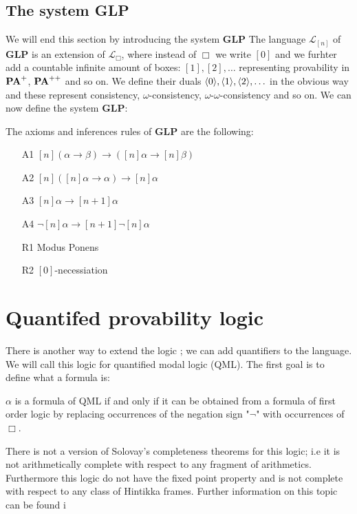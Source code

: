 \documentclass[../main.tex]{subfiles}
\begin{document}
\subsection{The system \textbf{GLP}}
We will end this section by introducing the system \textbf{GLP}
The language $\mathcal{L}_{[n]}$ of \textbf{GLP} is an extension of
$\mathcal{L}_\Box$, where instead of $\Box$ we write $[0]$ and we furhter add
a countable infinite amount of boxes:
$[1],[2],\ldots$ representing provability in $\text{\textbf{PA}}^+$, $\text{\textbf{PA}}^{++}$ and so on. We
define their duals $\langle 0\rangle,\langle 1\rangle, \langle 2\rangle,\ldots$ in the obvious way and
these represent consistency, $\omega$-consistency,
$\omega$-$\omega$-consistency and so on. We can now define the system
\textbf{GLP}:
\begin{defi}
	The axioms and inferences rules of \textbf{GLP} are the following:
	\begin{enumerate}
		\item[A1]
			$[n](\alpha\rightarrow\beta)\rightarrow([n]\alpha\rightarrow[n]\beta)$
		\item[A2] $[n]([n]\alpha\rightarrow\alpha)\rightarrow[n]\alpha$
		\item[A3] $[n]\alpha\rightarrow[n+1]\alpha$
		\item[A4] $\neg[n]\alpha\rightarrow[n+1]\neg[n]\alpha$
		\item[R1] Modus Ponens
		\item[R2] $[0]$-necessiation
	\end{enumerate}
\end{defi}

\section{Quantifed provability logic}
There is another way to extend the logic \GL; we can add quantifiers to the
language. We will call this logic for quantified modal logic (QML). The first
goal is to define what a formula is:
\begin{defi}
	$\alpha$ is a formula of QML if and only if it can be obtained from a
	formula of first order logic by
	replacing occurrences of the negation sign "$\neg$" with occurrences of
	$\Box$. 
\end{defi}

	There is not a version of Solovay's completeness theorems for this
	logic; i.e it is not arithmetically complete with respect to any
	fragment of arithmetics. Furthermore this logic  do not have the fixed point property and
	is not complete with respect to any class of Hintikka frames. Further information on this topic can be found i \cite{Boolos1993}
\end{document}
